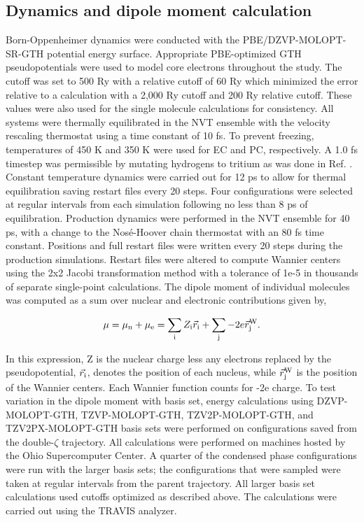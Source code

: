 \begin{ecpc}
   \subsection{\label{ch4:sec1:level3}Dynamics and dipole moment calculation}
    Born-Oppenheimer dynamics were conducted with the PBE/DZVP-MOLOPT-SR-GTH potential energy surface. Appropriate PBE-optimized GTH 
    pseudopotentials were used to model core electrons throughout the study. The cutoff was set to 500 Ry with a relative cutoff of 60 Ry which 
    minimized the error relative to a calculation with a 2,000 Ry cutoff and 200 Ry relative cutoff. These values were also used for the single 
    molecule calculations for consistency. All systems were thermally equilibrated in the NVT ensemble with the velocity rescaling thermostat 
    using a time constant of 10 fs. To prevent freezing, temperatures of 450 K and 350 K were used for EC and PC, respectively. A 1.0 fs timestep
    was permissible by mutating hydrogens to tritium as was done in Ref. \cite{leung2010liion}. Constant temperature dynamics were carried out for 12 ps to allow
    for thermal equilibration saving restart files every 20 steps. Four configurations were selected at regular intervals from each simulation 
    following no less than 8 ps of equilibration. Production dynamics were performed in the NVT ensemble for 40 ps, with a change to the Nos\'{e}-Hoover 
    chain thermostat\cite{martyna1992nose} with an 80 fs time constant. Positions and full restart files were written every 20 steps during the production simulations. 
    Restart files were altered to compute Wannier centers using the 2x2 Jacobi transformation method with a tolerance of 1e-5 in thousands of 
    separate single-point calculations. The dipole moment of individual molecules was computed as a sum over nuclear and electronic contributions given
    by,

    \begin{equation}
       \mu = \mu_{\mathrm{n}} + \mu_{\mathrm{e}} = \sum_{\mathrm{i}} Z_{\mathrm{i}}\vec{r}_{\mathrm{i}} + \sum_{\mathrm{j}} -2e\vec{r}^{\mathrm{W}}_{\mathrm{j}}.
    \end{equation}

    \noindent In this expression, Z is the nuclear charge less any electrons replaced by the pseudopotential, $\vec{r}_{\mathrm{i}}$, denotes 
    the position of each nucleus, while $\vec{r}^{\mathrm{W}}_{\mathrm{j}}$ is the position of the Wannier centers. Each Wannier function counts for -2e charge.
    To test variation in the dipole moment with basis set, energy calculations using DZVP-MOLOPT-GTH, TZVP-MOLOPT-GTH, TZV2P-MOLOPT-GTH, and 
    TZV2PX-MOLOPT-GTH basis sets were performed on configurations saved from the double-$\zeta$ trajectory. All calculations were performed on 
    machines hosted by the Ohio Supercomputer Center\cite{osc}. A quarter of the condensed phase configurations were run with the larger basis sets; the 
    configurations that were sampled were taken at regular intervals from the parent trajectory. All larger basis set calculations used cutoffs 
    optimized as described above. The calculations were carried out using the TRAVIS analyzer\cite{brehm2011travis}.


\end{ecpc}
